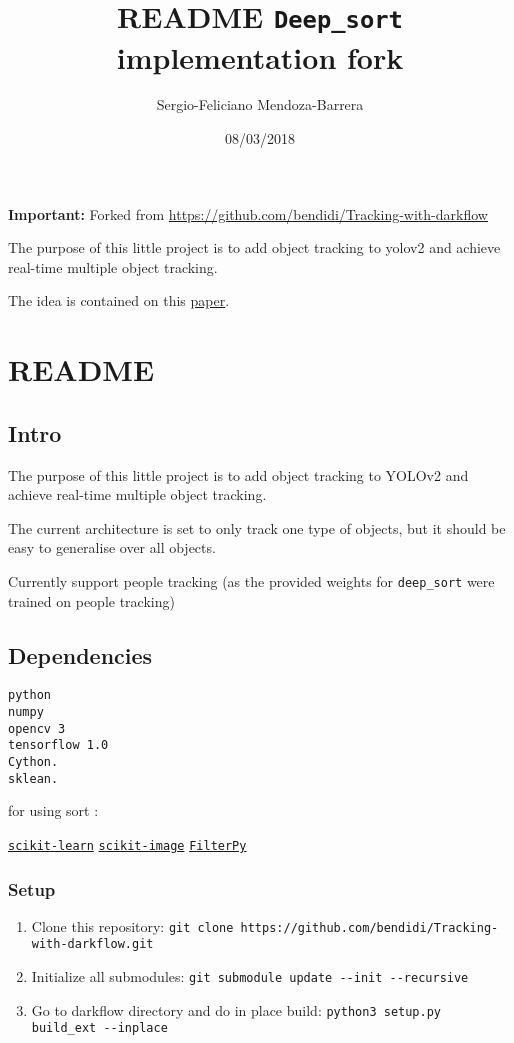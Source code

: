\documentclass[letterpaper, 9pt, onecolumn, twoside, technote, final]{IEEEtran}
\author{Sergio-Feliciano Mendoza-Barrera}
\date{08/03/2018}
\title{README \texttt{Deep\_sort} implementation fork}
\begin{document}
\maketitle
\setcounter{tocdepth}{2}
\tableofcontents

\begin{ABSTRACT}
\textbf{Important:} Forked from \url{https://github.com/bendidi/Tracking-with-darkflow}

The purpose of this little project is to add object tracking to yolov2
and achieve real-time multiple object tracking.

The idea is contained on this \href{file:///home/jaalkab/src/dod/dod\_people\_tracking/docs/1703.07402.pdf}{paper}.
\end{ABSTRACT}

\section{README}
\label{sec:org7a186d2}

\subsection{Intro}
\label{sec:orgf815d98}
The purpose of this little project is to add object tracking to YOLOv2
and achieve real-time multiple object tracking.

The current architecture is set to only track one type of objects, but
it should be easy to generalise over all objects.

Currently support people tracking (as the provided weights for
\texttt{deep\_sort} were trained on people tracking)

\subsection{Dependencies}
\label{sec:orgada548f}
\begin{verbatim}
python
numpy
opencv 3
tensorflow 1.0
Cython.
sklean.
\end{verbatim}

for using sort :

\href{http://scikit-learn.org/stable/}{\texttt{scikit-learn}}
\href{http://scikit-image.org/download}{\texttt{scikit-image}}
\href{https://github.com/rlabbe/filterpy}{\texttt{FilterPy}}

\subsubsection{Setup}
\label{sec:org21ca4bb}
\begin{enumerate}
\item Clone this repository:
\texttt{git clone https://github.com/bendidi/Tracking-with-darkflow.git}

\item Initialize all submodules:
\texttt{git submodule update -{}-init -{}-recursive}

\item Go to darkflow directory and do in place build:
\texttt{python3 setup.py build\_ext -{}-inplace}
\end{enumerate}
\end{document}
